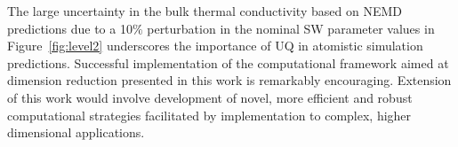 %
The large uncertainty in the bulk thermal conductivity based on NEMD predictions due to
a 10$\%$ perturbation in the nominal SW parameter values in Figure~\ref{fig:level2} underscores
the importance of UQ in atomistic simulation predictions. Successful implementation of the
computational framework aimed at dimension reduction presented in this work is remarkably
encouraging. Extension of this work would involve development of novel, more efficient and
robust computational strategies facilitated by implementation to complex, higher dimensional
applications.
